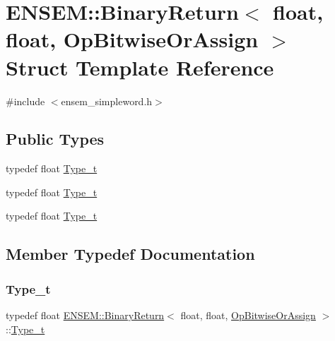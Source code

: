 \hypertarget{structENSEM_1_1BinaryReturn_3_01float_00_01float_00_01OpBitwiseOrAssign_01_4}{}\section{E\+N\+S\+EM\+:\+:Binary\+Return$<$ float, float, Op\+Bitwise\+Or\+Assign $>$ Struct Template Reference}
\label{structENSEM_1_1BinaryReturn_3_01float_00_01float_00_01OpBitwiseOrAssign_01_4}


{\ttfamily \#include $<$ensem\+\_\+simpleword.\+h$>$}

\subsection*{Public Types}
\begin{DoxyCompactItemize}
\item 
typedef float \mbox{\hyperlink{structENSEM_1_1BinaryReturn_3_01float_00_01float_00_01OpBitwiseOrAssign_01_4_a3e0892dc0a6beaa65d6fbf03b5fe3250}{Type\+\_\+t}}
\item 
typedef float \mbox{\hyperlink{structENSEM_1_1BinaryReturn_3_01float_00_01float_00_01OpBitwiseOrAssign_01_4_a3e0892dc0a6beaa65d6fbf03b5fe3250}{Type\+\_\+t}}
\item 
typedef float \mbox{\hyperlink{structENSEM_1_1BinaryReturn_3_01float_00_01float_00_01OpBitwiseOrAssign_01_4_a3e0892dc0a6beaa65d6fbf03b5fe3250}{Type\+\_\+t}}
\end{DoxyCompactItemize}


\subsection{Member Typedef Documentation}
\mbox{\label{structENSEM_1_1BinaryReturn_3_01float_00_01float_00_01OpBitwiseOrAssign_01_4_a3e0892dc0a6beaa65d6fbf03b5fe3250}} 
\subsubsection{\texorpdfstring{Type\_t}{Type\_t}\hspace{0.1cm}{\footnotesize\ttfamily [1/3]}}
{\footnotesize\ttfamily typedef float \mbox{\hyperlink{structENSEM_1_1BinaryReturn}{E\+N\+S\+E\+M\+::\+Binary\+Return}}$<$ float, float, \mbox{\hyperlink{structENSEM_1_1OpBitwiseOrAssign}{Op\+Bitwise\+Or\+Assign}} $>$\+::\mbox{\hyperlink{structENSEM_1_1BinaryReturn_3_01float_00_01float_00_01OpBitwiseOrAssign_01_4_a3e0892dc0a6beaa65d6fbf03b5fe3250}{Type\+\_\+t}}}

